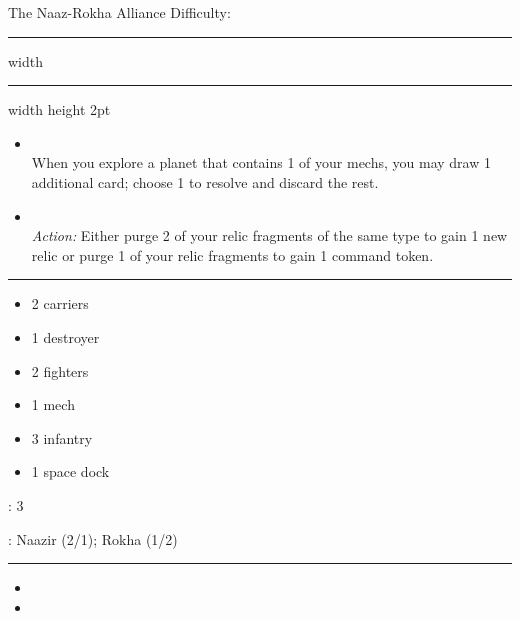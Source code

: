 {\handel\Huge The Naaz-Rokha Alliance} \hfill {\Large Difficulty: \easy} \vspace{-4pt}\\
\hrule width \hsize \kern 1mm \hrule width \hsize height 2pt


\begin{multicols}{2}


\begin{itemize}
\item {}\\
When you explore a planet that contains 1 of your mechs, you may draw 1 additional card; choose 1 to resolve and discard the rest.
\item {} \\
\emph{Action:} Either purge 2 of your relic fragments of the same type to gain 1 new relic or purge 1 of your relic fragments to gain 1 command token.
\end{itemize}


\vspace{-10pt}\rule{\hsize}{0.4pt}\vspace{5pt}


\vspace{-5pt}
\begin{multicols}{2}
\begin{itemize}
\item 2 carriers
\item 1 destroyer
\item 2 fighters
\item 1 mech
\item 3 infantry
\item 1 space dock
\end{itemize}
\end{multicols}

\vspace{-5pt}
: 3

\vspace{2pt}
: Naazir (2/1); Rokha (1/2)

\rule{\hsize}{0.4pt}\vspace{5pt}


\begin{itemize}
\item \psycho
\item \development
\end{itemize}


\end{multicols}
